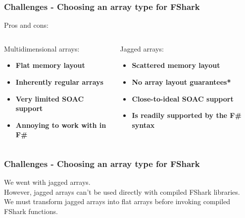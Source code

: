\documentclass[10pt, compress, usenames, dvipsnames]{beamer}
\begin{document}
\begin{frame}[fragile]
  \frametitle{Challenges - Choosing an array type for FShark}
  Pros and cons:\\
  \begin{columns}
    \begin{column}{.48\textwidth}
      Multidimensional arrays:\\
      \begin{itemize}
      \item<1-> {\color{ForestGreen} \textbf{Flat memory layout}}
      \item<2-> {\color{ForestGreen} \textbf{Inherently regular arrays}}
      \item<3-> {\color{red} \textbf{Very limited SOAC support}}
      \item<4-> {\color{red} \textbf{Annoying to work with in F\#}}
      \end{itemize}
    \end{column}
    \begin{column}{.48\textwidth}
      Jagged arrays:\\
      \begin{itemize}
      \item<1-> {\color{red} \textbf{Scattered memory layout}}
      \item<2-> {\color{red} \textbf{No array layout guarantees*}} 
      \item<3-> {\color{ForestGreen} \textbf{Close-to-ideal SOAC support}}
      \item<4-> {\color{ForestGreen} \textbf{Is readily supported by the F\# syntax}}
      \end{itemize}
    \end{column}
  \end{columns}
\end{frame}

\begin{frame}[fragile]
  \frametitle{Challenges - Choosing an array type for FShark}
  We went with jagged arrays.\\
  However, jagged arrays can't be used directly with compiled FShark libraries.\\
  \pause
  We must transform jagged arrays into flat arrays before invoking compiled
  FShark functions.
\end{frame}
\end{document}
